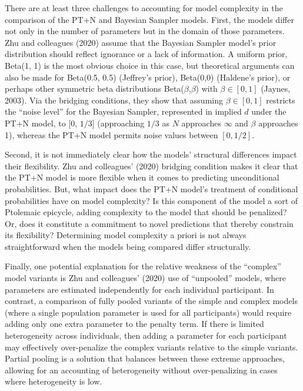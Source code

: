 \documentclass[
  english,
  man,floatsintext]{apa6}
\begin{document}
There are at least three challenges to accounting for model complexity in the comparison of the PT+N and Bayesian Sampler models. First, the models differ not only in the number of parameters but in the domain of those parameters. Zhu and colleagues (2020) assume that the Bayesian Sampler model's prior distribution should reflect ignorance or a lack of information. A uniform prior, Beta(1, 1) is the most obvious choice in this case, but theoretical arguments can also be made for Beta(0.5, 0.5) (Jeffrey's prior), Beta(0,0) (Haldene's prior), or perhaps other symmetric beta distributions Beta(\(\beta\),\(\beta\)) with \(\beta \in [0, 1]\) (Jaynes, 2003). Via the bridging conditions, they show that assuming \(\beta \in [0, 1]\) restricts the ``noise level'' for the Bayesian Sampler, represented in implied \(d\) under the PT+N model, to {[}0, \(1/3\){]} (approaching \(1/3\) as \(N\) approaches \(\infty\) and \(\beta\) approaches 1), whereas the PT+N model permits noise values between \([0, 1/2]\).

Second, it is not immediately clear how the models' structural differences impact their flexibility. Zhu and colleagues' (2020) bridging condition makes it clear that the PT+N model is more flexible when it comes to predicting unconditional probabilities. But, what impact does the PT+N model's treatment of conditional probabilities have on model complexity? Is this component of the model a sort of Ptolemaic epicycle, adding complexity to the model that should be penalized? Or, does it constitute a commitment to novel predictions that thereby constrain its flexibility? Determining model complexity a priori is not always straightforward when the models being compared differ structurally.

Finally, one potential explanation for the relative weakness of the ``complex'' model variants is Zhu and colleagues' (2020) use of ``unpooled'' models, where parameters are estimated independently for each individual participant. In contrast, a comparison of fully pooled variants of the simple and complex models (where a single population parameter is used for all participants) would require adding only one extra parameter to the penalty term. If there is limited heterogeneity across individuals, then adding a parameter for each participant may effectively over-penalize the complex variants relative to the simple variants. Partial pooling is a solution that balances between these extreme approaches, allowing for an accounting of heterogeneity without over-penalizing in cases where heterogeneity is low.
\end{document}
